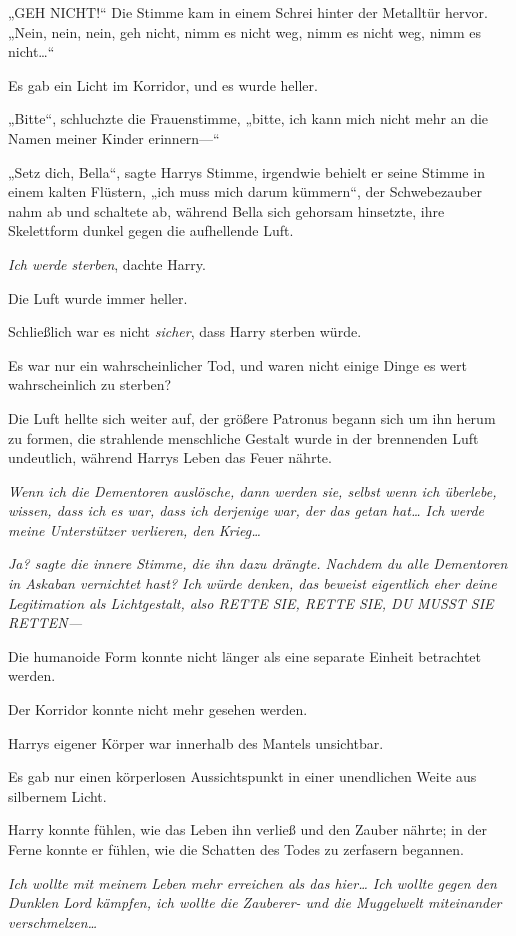 {„GEH NICHT!“ Die Stimme kam in einem Schrei hinter der Metalltür hervor. „Nein, nein, nein, geh nicht, nimm es nicht weg, nimm es nicht weg, nimm es nicht…“

Es gab ein Licht im Korridor, und es wurde heller.

„Bitte“, schluchzte die Frauenstimme, „bitte, ich kann mich nicht mehr an die Namen meiner Kinder erinnern—“

„Setz dich, Bella“, sagte Harrys Stimme, irgendwie behielt er seine Stimme in einem kalten Flüstern, „ich muss mich darum kümmern“, der Schwebezauber nahm ab und schaltete ab, während Bella sich gehorsam hinsetzte, ihre Skelettform dunkel gegen die aufhellende Luft.

\emph{Ich werde sterben}, dachte Harry.

Die Luft wurde immer heller.

Schließlich war es nicht \emph{sicher}, dass Harry sterben würde.

Es war nur ein wahrscheinlicher Tod, und waren nicht einige Dinge es wert wahrscheinlich zu sterben?

Die Luft hellte sich weiter auf, der größere Patronus begann sich um ihn herum zu formen, die strahlende menschliche Gestalt wurde in der brennenden Luft undeutlich, während Harrys Leben das Feuer nährte.

\emph{Wenn ich die Dementoren auslösche, dann werden sie, selbst wenn ich überlebe, wissen, dass ich es war, dass ich derjenige war, der das getan hat… Ich werde meine Unterstützer verlieren, den Krieg…}

\emph{\emph{Ja?} sagte die innere Stimme, die ihn dazu drängte. \emph{Nachdem du alle Dementoren in Askaban vernichtet hast? Ich würde denken, das beweist eigentlich eher deine Legitimation als Lichtgestalt, also RETTE SIE, RETTE SIE, DU MUSST SIE RETTEN—} }

Die humanoide Form konnte nicht länger als eine separate Einheit betrachtet werden.

Der Korridor konnte nicht mehr gesehen werden.

Harrys eigener Körper war innerhalb des Mantels unsichtbar.

Es gab nur einen körperlosen Aussichtspunkt in einer unendlichen Weite aus silbernem Licht.

Harry konnte fühlen, wie das Leben ihn verließ und den Zauber nährte; in der Ferne konnte er fühlen, wie die Schatten des Todes zu zerfasern begannen.

\emph{Ich wollte mit meinem Leben mehr erreichen als das hier… Ich wollte gegen den Dunklen Lord kämpfen, ich wollte die Zauberer- und die Muggelwelt miteinander verschmelzen…}

}
